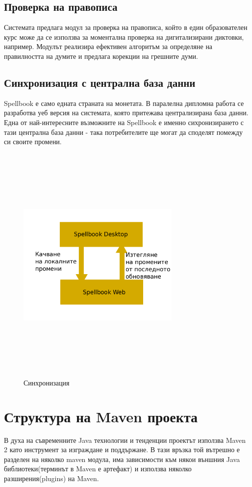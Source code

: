 \subsection{Проверка на правописа}
Системата предлага модул за проверка на правописа, който в един
образователен курс може да се използва за моментална проверка на
дигитализирани диктовки, например. Модулът реализира ефективен
алгоритъм за определяне на правилността на думите и предлага корекции
на грешните думи. 
\subsection{Синхронизация с централна база данни}
Spellbook е само едната страната на монетата. В паралелна дипломна
работа се разработва уеб версия на системата, която притежава
централизирана база данни. Една от най-интересните възможните на
Spellbook е именно сихронизирането с тази централна база данни - така
потребителите ще могат да споделят помежду си своите промени.

\begin{figure}[htbp]
  \caption{Синхронизация}
  \centering
  \includegraphics[width=80mm, height=120mm]{images/sync_flow.png}
\end{figure} 
\section{Структура на Maven проекта}
В духа на съвременните Java технологии и тенденции проектът използва
Maven 2 като инструмент за изграждане и поддържане. В тази връзка той
вътрешно е разделен на няколко maven модула, има зависимости към някои
външния Java библиотеки(терминът в Maven е артефакт) и използва
няколко разширения(plugins) на Maven.
